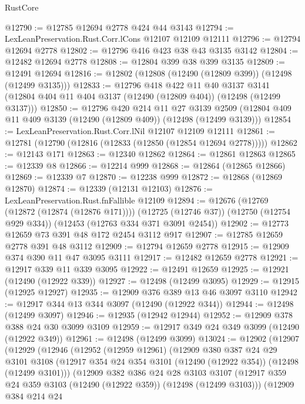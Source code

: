 \begin{lexlean}{RustCore}
\begin{coremodule}
@12790 := @12785 @12694 @2778 @424 @44 @3143
@12794 := LexLeanPreservation.Rust.Corr.lCons @12107 @12109 @12111
@12796 := @12794 @12694 @2778
@12802 := @12796 @416 @423 @38 @43 @3135 @3142
@12804 := @12482 @12694 @2778
@12808 := @12804 @399 @38 @399 @3135
@12809 := @12491 @12694
@12816 := @12802 (@12808 (@12490 (@12809 @399)) (@12498 (@12499 @3135)))
@12833 := @12796
    @418
    @422
    @11
    @40
    @3137
    @3141
    (@12804 @404 @11 @404 @3137 (@12490 (@12809 @404)) (@12498 (@12499 @3137)))
@12850 := @12796
    @420
    @214
    @11
    @27
    @3139
    @2509
    (@12804 @409 @11 @409 @3139 (@12490 (@12809 @409)) (@12498 (@12499 @3139)))
@12854 := LexLeanPreservation.Rust.Corr.lNil @12107 @12109 @12111
@12861 := @12781 (@12790 (@12816 (@12833 (@12850 (@12854 @12694 @2778)))))
@12862 := @12143 @171
@12863 := @12340 @12862
@12864 := @12861 @12863
@12865 := @12339 @8
@12866 := @12214 @999
@12868 := @12864 (@12865 @12866)
@12869 := @12339 @7
@12870 := @12238 @999
@12872 := @12868 (@12869 @12870)
@12874 := @12339 (@12131 @12103)
@12876 := LexLeanPreservation.Rust.fnFallible @12109
@12894 := @12676
    (@12769 (@12872 (@12874 (@12876 @171))))
    (@12725 (@12746 @37))
    (@12750 (@12754 @929 @334))
    (@12453 (@12763 @334 @371 @3091 @2454))
@12902 := @12773 @12659 @73 @391 @48 @172 @2454 @3112 @917
@12907 := @12785 @12659 @2778 @391 @48 @3112
@12909 := @12794 @12659 @2778
@12915 := @12909 @374 @390 @11 @47 @3095 @3111
@12917 := @12482 @12659 @2778
@12921 := @12917 @339 @11 @339 @3095
@12922 := @12491 @12659
@12925 := @12921 (@12490 (@12922 @339))
@12927 := @12498 (@12499 @3095)
@12929 := @12915 (@12925 @12927)
@12935 := @12909 @376 @389 @13 @46 @3097 @3110
@12942 := @12917 @344 @13 @344 @3097 (@12490 (@12922 @344))
@12944 := @12498 (@12499 @3097)
@12946 := @12935 (@12942 @12944)
@12952 := @12909 @378 @388 @24 @30 @3099 @3109
@12959 := @12917 @349 @24 @349 @3099 (@12490 (@12922 @349))
@12961 := @12498 (@12499 @3099)
@13024 := @12902
    (@12907
      (@12929
        (@12946
          (@12952
            (@12959 @12961)
            (@12909
              @380
              @387
              @24
              @29
              @3101
              @3108
              (@12917 @354 @24 @354 @3101 (@12490 (@12922 @354)) (@12498 (@12499 @3101)))
              (@12909
                @382
                @386
                @24
                @28
                @3103
                @3107
                (@12917 @359 @24 @359 @3103 (@12490 (@12922 @359)) (@12498 (@12499 @3103)))
                (@12909
                  @384
                  @214
                  @24

\end{coremodule}
\end{lexlean}
